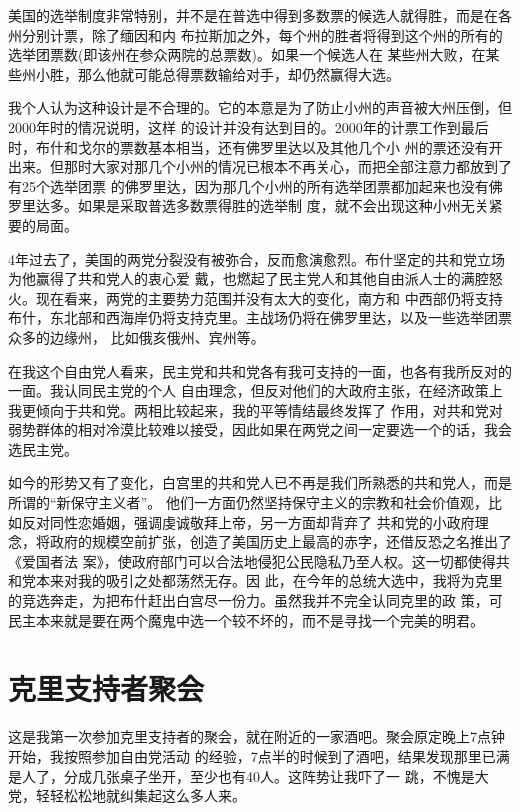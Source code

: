 ﻿\documentclass[11pt]{article}
\begin{document}
美国的选举制度非常特别，并不是在普选中得到多数票的候选人就得胜，而是在各州分别计票，除了缅因和内
布拉斯加之外，每个州的胜者将得到这个州的所有的选举团票数(即该州在参众两院的总票数)。如果一个候选人在
某些州大败，在某些州小胜，那么他就可能总得票数输给对手，却仍然赢得大选。

我个人认为这种设计是不合理的。它的本意是为了防止小州的声音被大州压倒，但2000年时的情况说明，这样
的设计并没有达到目的。2000年的计票工作到最后时，布什和戈尔的票数基本相当，还有佛罗里达以及其他几个小
州的票还没有开出来。但那时大家对那几个小州的情况已根本不再关心，而把全部注意力都放到了有25个选举团票
的佛罗里达，因为那几个小州的所有选举团票都加起来也没有佛罗里达多。如果是采取普选多数票得胜的选举制
度，就不会出现这种小州无关紧要的局面。

4年过去了，美国的两党分裂没有被弥合，反而愈演愈烈。布什坚定的共和党立场为他赢得了共和党人的衷心爱
戴，也燃起了民主党人和其他自由派人士的满腔怒火。现在看来，两党的主要势力范围并没有太大的变化，南方和
中西部仍将支持布什，东北部和西海岸仍将支持克里。主战场仍将在佛罗里达，以及一些选举团票众多的边缘州，
比如俄亥俄州、宾州等。

在我这个自由党人看来，民主党和共和党各有我可支持的一面，也各有我所反对的一面。我认同民主党的个人
自由理念，但反对他们的大政府主张，在经济政策上我更倾向于共和党。两相比较起来，我的平等情结最终发挥了
作用，对共和党对弱势群体的相对冷漠比较难以接受，因此如果在两党之间一定要选一个的话，我会选民主党。

如今的形势又有了变化，白宫里的共和党人已不再是我们所熟悉的共和党人，而是所谓的``新保守主义者''。
他们一方面仍然坚持保守主义的宗教和社会价值观，比如反对同性恋婚姻，强调虔诚敬拜上帝，另一方面却背弃了
共和党的小政府理念，将政府的规模空前扩张，创造了美国历史上最高的赤字，还借反恐之名推出了《爱国者法
案》，使政府部门可以合法地侵犯公民隐私乃至人权。这一切都使得共和党本来对我的吸引之处都荡然无存。因
此，在今年的总统大选中，我将为克里的竞选奔走，为把布什赶出白宫尽一份力。虽然我并不完全认同克里的政
策，可民主本来就是要在两个魔鬼中选一个较不坏的，而不是寻找一个完美的明君。

\section{克里支持者聚会}

这是我第一次参加克里支持者的聚会，就在附近的一家酒吧。聚会原定晚上7点钟开始，我按照参加自由党活动
的经验，7点半的时候到了酒吧，结果发现那里已满是人了，分成几张桌子坐开，至少也有40人。这阵势让我吓了一
跳，不愧是大党，轻轻松松地就纠集起这么多人来。
\end{document}
